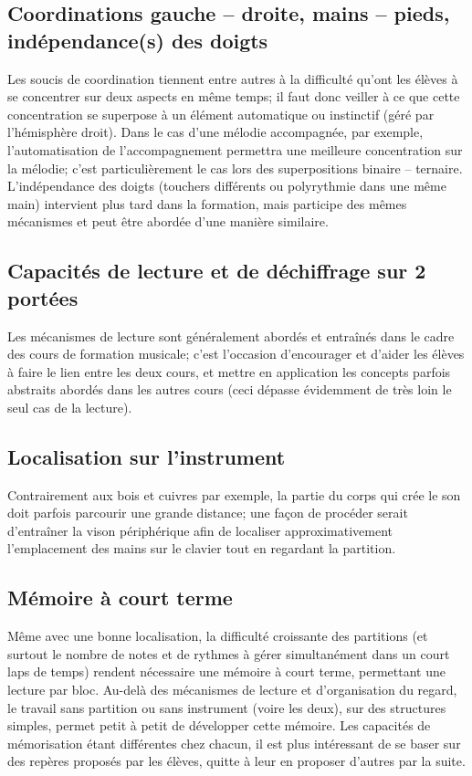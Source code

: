 \subsection*{Coordinations gauche -- droite, mains -- pieds, indépendance(s) des doigts}
Les soucis de coordination tiennent entre autres à la difficulté qu'ont les élèves à se concentrer sur deux aspects en même temps; il faut donc veiller à ce que cette concentration se superpose à un élément automatique ou instinctif (géré par l'hémisphère droit). Dans le cas d'une mélodie accompagnée, par exemple, l'automatisation de l'accompagnement permettra une meilleure concentration sur la mélodie; c'est particulièrement le cas lors des superpositions binaire -- ternaire. L'indépendance des doigts (touchers différents ou polyrythmie dans une même main) intervient plus tard dans la formation, mais participe des mêmes mécanismes et peut être abordée d'une manière similaire.

\subsection*{Capacités de lecture et de déchiffrage sur 2 portées}
Les mécanismes de lecture sont généralement abordés et entraînés dans le cadre des cours de formation musicale; c'est l'occasion d'encourager et d'aider les élèves à faire le lien entre les deux cours, et mettre en application les concepts parfois abstraits abordés dans les autres cours (ceci dépasse évidemment de très loin le seul cas de la lecture).

\subsection*{Localisation sur l'instrument}
Contrairement aux bois et cuivres par exemple, la partie du corps qui crée le son doit parfois parcourir une grande distance; une façon de procéder serait d'entraîner la vison périphérique afin de localiser approximativement l'emplacement des mains sur le clavier tout en regardant la partition.

\subsection*{Mémoire à court terme}
Même avec une bonne localisation, la difficulté croissante des partitions (et surtout le nombre de notes et de rythmes à gérer simultanément dans un court laps de temps) rendent nécessaire une mémoire à court terme, permettant une lecture par \og{} bloc\fg{}. Au-delà des mécanismes de lecture et d'organisation du regard, le travail sans partition ou sans instrument (voire les deux), sur des structures simples, permet petit à petit de développer cette mémoire. Les capacités de mémorisation étant différentes chez chacun, il est plus intéressant de se baser sur des repères proposés par les élèves, quitte à leur en proposer d'autres par la suite.

